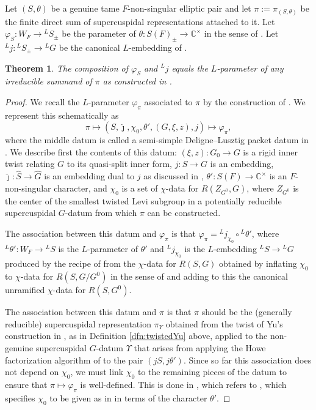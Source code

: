 \documentclass{article}
\def\C{\mathbb{C}}
\def\hat{\widehat}
\newtheorem{thm}{Theorem}[subsection]
\theoremstyle{definition}
\numberwithin{equation}{subsection}
\renewcommand{\-}{\hyp{}}
\begin{document}
Let $(S,\theta)$ be a genuine tame $F$-non-singular elliptic pair and let $\pi:=\pi_{(S,\theta)}$ be the finite direct sum of supercuspidal representations attached to it.
Let $\varphi_S : W_F \to {^LS}_\pm$ be  the parameter of $\theta : S(F)_\pm \to \C^\times$ in the sense of \cite[Theorem 3.4.3]{KalDC}. Let $^Lj : {^LS}_\pm \to {^LG}$ be the canonical $L$-embedding  of \cite[\S4.1]{KalDC}.

\begin{thm} \label{thm:llc}
	The composition of $\varphi_S$ and $^Lj$ equals the $L$-parameter of any irreducible summand of $\pi$ as constructed in \cite[\S4]{KalSLP}.
\end{thm}
\begin{proof}
	We recall the $L$-parameter  $\varphi_\pi$ associated to $\pi$ by the construction of \cite[\S4.1,\S4.2]{KalSLP}. We represent this schematically as 
	\[ \pi \mapsto (S,\hat\jmath,\chi_0,\theta',(G,\xi,z),j) \mapsto \varphi_\pi, \] 
	where the middle datum is called a semi-simple Deligne--Lusztig packet datum in \cite{KalSLP}. We describe first the contents of this datum: $(\xi,z) : G_0 \to G$ is a rigid inner twist relating $G$ to its quasi-split inner form, $j : S \to G$ is an embedding, $\hat\jmath : \hat S \to \hat G$ is an embedding dual to $j$ as discussed in \cite[\S5.1]{KalRSP}, $\theta' : S(F) \to \C^\times$ is an $F$-non-singular character, and $\chi_0$ is a set of $\chi$-data for $R(Z_{G^0},G)$, where $Z_{G^0}$ is the center of the smallest twisted Levi subgroup in a potentially reducible supercuspidal $G$-datum from which $\pi$ can be constructed. 


	The association between this datum and $\varphi_\pi$ is that $\varphi_\pi = {^Lj}_{\chi_0}\circ{^L\theta'}$, where $^L\theta' : W_F \to {^LS}$ is the $L$-parameter of $\theta'$ and $^Lj_{\chi_0}$ is the $L$-embedding $^LS \to {^LG}$ produced by the recipe of \cite[\S2.6]{LS87} from the $\chi$-data for $R(S,G)$ obtained by inflating $\chi_0$ to $\chi$-data for $R(S,G/G^0)$ in the sense of \cite[Definition 5.3.5]{KalDC} and adding to this the canonical unramified $\chi$-data for $R(S,G^0)$. 
	
	The association between this datum and $\pi$ is that $\pi$ should be the (generally reducible) supercuspidal representation $\pi_\Upsilon$ obtained from the twist of Yu's construction in \cite{FKS23}, as in Definition \ref{dfn:twistedYu} above, applied to the non-genuine supercuspidal $G$-datum $\Upsilon$ that arises from applying the Howe factorization algorithm of \cite[\S3.6]{KalRSP} to the pair $(jS,j\theta')$. Since so far this association does not depend on $\chi_0$, we must link $\chi_0$ to the remaining pieces of the datum to ensure that $\pi \mapsto \varphi_\pi$ is well-defined. This is done in \cite[\S4.2]{KalSLP}, which refers to \cite[\S3.5]{KalSLP}, which specifies $\chi_0$ to be given as in \cite[\S4.2]{FKS23} in terms of the character $\theta'$. 


\end{proof}
\end{document}
